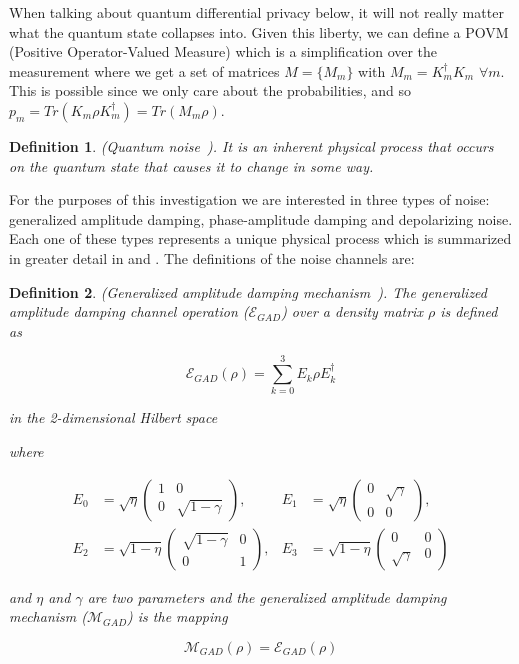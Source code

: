 \documentclass{ieeeaccess}
\newtheorem{definition}{Definition}[section]
\begin{document}
When talking about quantum differential privacy below, it will not really matter what the quantum state collapses into. Given this liberty, we can define a POVM (Positive Operator-Valued Measure) which is a simplification over the measurement where we get a set of matrices $M = \{M_m\}$ with $M_m = K^{\dagger}_{m}K_{m}$ $\forall m$. This is possible since we only care about the probabilities, and so $p_m = Tr(K_{m} \rho K^{\dagger}_{m}) = Tr(M_m\rho)$.

\begin{definition}
  (Quantum noise~\cite{zhou2017differential}). It is an inherent physical process that occurs on the quantum state that causes it to change in some way.
  \label{def:quantum_noise}
\end{definition}

For the purposes of this investigation we are interested in three types of noise: generalized amplitude damping, phase-amplitude damping and depolarizing noise. Each one of these types represents a unique physical process which is summarized in greater detail in \cite{song2025hybrid} and \cite{zhou2017differential}. The definitions of the noise channels are:

\begin{definition}
  (Generalized amplitude damping mechanism~\cite{zhou2017differential}). The generalized amplitude damping channel operation ($\mathcal{E}_{GAD}$) over a density matrix $\rho$ is defined as

  \[
    \mathcal{E}_{GAD}(\rho) = \sum_{k = 0}^{3}E_{k}\rho E_{k}^{\dagger}
  \]

  in the 2-dimensional Hilbert space

  where

  \begin{align*}
    E_0 &= \sqrt{\eta}
    \begin{pmatrix} 1 & 0 \\ 0 & \sqrt{1-\gamma}
    \end{pmatrix}, &
    E_1 &= \sqrt{\eta}
    \begin{pmatrix} 0 & \sqrt{\gamma} \\ 0 & 0
    \end{pmatrix}, \\
    E_2 &= \sqrt{1-\eta}
    \begin{pmatrix} \sqrt{1-\gamma} & 0 \\ 0 & 1
    \end{pmatrix}, &
    E_3 &= \sqrt{1-\eta}
    \begin{pmatrix} 0 & 0 \\ \sqrt{\gamma} & 0
    \end{pmatrix}
  \end{align*}

  and $\eta$ and $\gamma$ are two parameters
  and the generalized amplitude damping mechanism ($\mathcal{M}_{GAD}$) is the mapping

  \[
    \mathcal{M}_{GAD}(\rho) = \mathcal{E}_{GAD}(\rho)
  \]
  \label{def:gad}
\end{definition}
\end{document}
